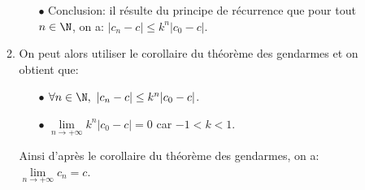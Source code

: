 \begin{correction}
\begin{enumerate}
\begin{enumerate}
\begin{itemize}
\item[$\bullet$] Conclusion: il r\'esulte du principe de r\'ecurrence que pour tout $n\in\N$, on a: $|c_n-c|\leq k^n |c_0-c|$.
\end{itemize}
\item On peut alors utiliser le corollaire du th\'eor\`{e}me des gendarmes et on obtient que:
\begin{itemize}
\item[$\bullet$] $\forall n\in\N,\ |c_n-c|\leq k^n |c_0-c|$.
\item[$\bullet$] $\lim\limits_{n\to +\infty} k^n|c_0-c|=0$ car $-1<k<1$.
\end{itemize}
Ainsi d'apr\`{e}s le corollaire du th\'eor\`{e}me des gendarmes, on a: $\lim\limits_{n\to +\infty} c_n=c$.
\end{enumerate}
\end{enumerate}
\end{correction}